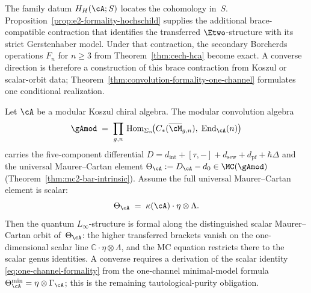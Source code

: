 \begin{remark}
\label{rem:e2-formality-vs-thmH}
The family datum $H_H(\cA;S)$ locates the cohomology in~$S$.
Proposition~\ref{prop:e2-formality-hochschild} supplies the additional
brace-compatible contraction that identifies the transferred
$\Etwo$-structure with its strict Gerstenhaber model.  Under that
contraction, the secondary Borcherds operations $F_n$ for $n\geq3$
from Theorem~\ref{thm:cech-hca} become exact.  A converse direction is
therefore a construction of this brace contraction from Koszul or
scalar-orbit data; Theorem~\ref{thm:convolution-formality-one-channel}
formulates one conditional realization.
\end{remark}

\begin{theorem}
\label{thm:convolution-formality-one-channel}
Let $\cA$ be a modular Koszul chiral algebra.
The modular convolution algebra
\[
\gAmod
\;=\;
\prod_{g,n}\,
\operatorname{Hom}_{\Sigma_n}\!\bigl(
 C_*(\overline{\cM}_{g,n}),\;
 \operatorname{End}_{\cA}(n)
\bigr)
\]
carries the five-component differential
$D = d_{\mathrm{int}} + [\tau,-] + d_{\mathrm{sew}}
 + d_{\mathrm{pf}} + \hbar\Delta$
and the universal Maurer--Cartan element
$\Theta_{\cA} := D_{\cA} - d_0
\in \MC(\gAmod)$
\textup{(}Theorem~\textup{\ref{thm:mc2-bar-intrinsic})}.
Assume the full universal Maurer--Cartan element is scalar:
\begin{equation}\label{eq:one-channel-formality}
\Theta_{\cA}
\;=\;
\kappa(\cA) \cdot \eta \otimes \Lambda.
\end{equation}
Then the quantum $L_\infty$-structure is formal along the
distinguished scalar Maurer--Cartan orbit of\/~$\Theta_{\cA}$:
the higher transferred brackets vanish on the one-dimensional
scalar line $\mathbb{C}\!\cdot\!\eta \otimes \Lambda$, and the MC
equation restricts there to the scalar genus identities.
A converse requires a derivation of the scalar identity
\eqref{eq:one-channel-formality} from the one-channel minimal-model
formula $\Theta_{\cA}^{\min}=\eta\otimes\Gamma_\cA$; this is the
remaining tautological-purity obligation.
\end{theorem}

